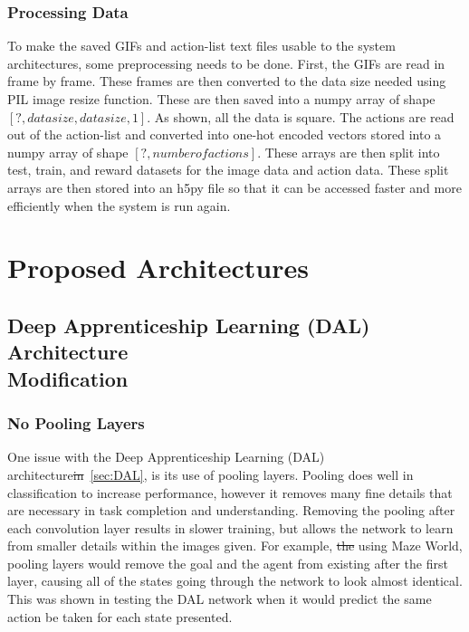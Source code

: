 \documentclass[12pt,american]{report}
\providecommand{\DIFaddtex}[1]{{\protect\color{blue}\uwave{#1}}} %
\providecommand{\DIFdeltex}[1]{{\protect\color{red}\sout{#1}}}                      %
\providecommand{\DIFaddbegin}{} %
\providecommand{\DIFaddend}{} %
\providecommand{\DIFdelbegin}{} %
\providecommand{\DIFdelend}{} %
\providecommand{\DIFadd}[1]{\texorpdfstring{\DIFaddtex{#1}}{#1}} %
\providecommand{\DIFdel}[1]{\texorpdfstring{\DIFdeltex{#1}}{}} %
\newcommand{\DIFscaledelfig}{0.5}
\newlength{\DIFdelgraphicswidth} %
\newlength{\DIFdelgraphicsheight} %
\newcommand{\DIFaddincludegraphics}[2][]{{\color{blue}\fbox{\DIFOincludegraphics[#1]{#2}}}} %
\newcommand{\DIFdelincludegraphics}[2][]{%
\sbox{\DIFdelgraphicsbox}{\DIFOincludegraphics[#1]{#2}}%
\settoboxwidth{\DIFdelgraphicswidth}{\DIFdelgraphicsbox} %
\settoboxtotalheight{\DIFdelgraphicsheight}{\DIFdelgraphicsbox} %
\scalebox{\DIFscaledelfig}{%
\parbox[b]{\DIFdelgraphicswidth}{\usebox{\DIFdelgraphicsbox}\\[-\baselineskip] \rule{\DIFdelgraphicswidth}{0em}}\llap{\resizebox{\DIFdelgraphicswidth}{\DIFdelgraphicsheight}{%
\setlength{\unitlength}{\DIFdelgraphicswidth}%
\begin{picture}(1,1)%
\thicklines\linethickness{2pt} %
{\color[rgb]{1,0,0}\put(0,0){\framebox(1,1){}}}%
{\color[rgb]{1,0,0}\put(0,0){\line( 1,1){1}}}%
{\color[rgb]{1,0,0}\put(0,1){\line(1,-1){1}}}%
\end{picture}%
}\hspace*{3pt}}} %
} %
\DeclareRobustCommand{\DIFaddbegin}{\DIFOaddbegin \let\includegraphics\DIFaddincludegraphics} %
\DeclareRobustCommand{\DIFaddend}{\DIFOaddend \let\includegraphics\DIFOincludegraphics} %
\DeclareRobustCommand{\DIFdelbegin}{\DIFOdelbegin \let\includegraphics\DIFdelincludegraphics} %
\DeclareRobustCommand{\DIFdelend}{\DIFOaddend \let\includegraphics\DIFOincludegraphics} %
\begin{document}
\subsection{Processing Data}
To make the saved GIFs and action-list text files usable to the system architectures, some preprocessing needs to be done.  First, the GIFs are read in frame by frame.  These frames are then converted to the data size needed using PIL image resize function.  These are then saved into a numpy array of shape $[?,data size, data size, 1]$.  As shown, all the data is square.  The actions are read out of the action-list and converted into one-hot encoded vectors stored into a numpy array of shape $[?,number of actions]$.  These arrays are then split into test, train, and reward datasets for the image data and action data.  These split arrays are then stored into an h5py file so that it can be accessed faster and more efficiently when the system is run again. 

\chapter{Proposed Architectures}
\label{sec:proposed_architectures}
\section{Deep Apprenticeship Learning (DAL) Architecture \DIFaddbegin \\\DIFaddend Modification}
\subsection{No Pooling Layers}
One issue with the Deep Apprenticeship Learning (DAL) architecture\DIFdelbegin \DIFdel{in}\DIFdelend \DIFaddbegin \DIFadd{~\mbox{%
\cite{markovikj2014deep} }%
in section}\DIFaddend ~\ref{sec:DAL}, is its use of pooling layers.  Pooling does well in classification to increase performance, however it removes many fine details that are necessary in task completion and understanding.  Removing the pooling after each convolution layer results in slower training, but allows the network to learn from smaller details within the images given.  For example, \DIFdelbegin \DIFdel{the }\DIFdelend using Maze World, pooling layers would remove the goal and the agent from existing after the first layer, causing all of the states going through the network to look almost identical.  This was shown in testing the DAL network when it would predict the same action be taken for each state presented.
\end{document}

